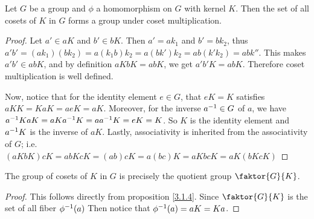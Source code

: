 \begin{theorem}\label{theorem_3.1.6}
  Let $G$ be a group and  $\phi$ a homomorphism on $G$ with kernel  $K$. Then
  the set of all cosets of  $K$ in  $G$ forms a group under coset
  multiplication.
\end{theorem}
\begin{proof}
  Let $a' \in aK$ and  $b' \in bK$. Then  $a'=ak_1$ and $b'=bk_2$, thus
  $a'b'=(ak_1)(bk_2)=a(k_1b)k_2=a(bk')k_2=ab(k'k_2)=abk''$. This makes $a'b'
  \in abK$, and by definition  $aKbK=abK$, we get  $a'b'K=abK$. Therefore
  coset multiplication is well defined.

  Now, notice that for the identity element  $e \in G$, that $eK=K$ satisfies
  $aKK=KaK=aeK=aK$. Moreover, for the inverse  $a^{-1} \in G$ of $a$, we have
  $a^{-1}KaK=aKa^{-1}K=aa^{-1}K=eK=K$. So $K$ is the identity element and
  $a^{-1}K$ is the inverse of  $aK$. Lastly, associativity is inherited from
  the associativity of $G$; i.e.
  $(aKbK)cK=abKcK=(ab)cK=a(bc)K=aKbcK=aK(bKcK)$
\end{proof}
\begin{corollary}
  The group of cosets of $K$ in  $G$ is precisely the quotient group
  $\faktor{G}{K}$.
\end{corollary}
\begin{proof}
  This follows directly from proposition \ref{3.1.4}. Since $\faktor{G}{K}$ is the
  set of all fiber $\phi^{-1}(a)$ Then notice that $\phi^{-1}(a)=aK=Ka$.
\end{proof}

